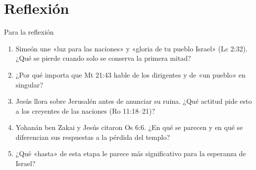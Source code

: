 \documentclass[hyperref={bookmarks=false},aspectratio=169]{beamer}
\begin{document}
\section{Reflexión}
\begin{frame}{Para la reflexión}
\small
\begin{enumerate}
\item Simeón une «luz para las naciones» y «gloria de tu pueblo Israel» (Lc 2:32). ¿Qué se pierde cuando solo se conserva la primera mitad?
\item ¿Por qué importa que Mt 21:43 hable de los dirigentes y de «un pueblo» en singular?
\item Jesús llora sobre Jerusalén antes de anunciar su ruina. ¿Qué actitud pide esto a los creyentes de las naciones (Ro 11:18--21)?
\item Yohanán ben Zakai y Jesús citaron Os 6:6. ¿En qué se parecen y en qué se diferencian sus respuestas a la pérdida del templo?
\item ¿Qué «hasta» de esta etapa le parece más significativo para la esperanza de Israel?
\end{enumerate}
\end{frame}

\end{document}
